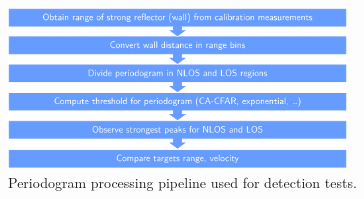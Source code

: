 			\begin{figure}[H]
				\centering
				\includegraphics[width=0.8\textwidth]{Images/Test1/NLOS-proc-pipeline_wide_text12.png}
				\caption{\small Periodogram processing pipeline used for detection tests.}
				\label{fig:Test1_NLOS-proc-pipeline}
			\end{figure}
			
			
		 
			
			
		







